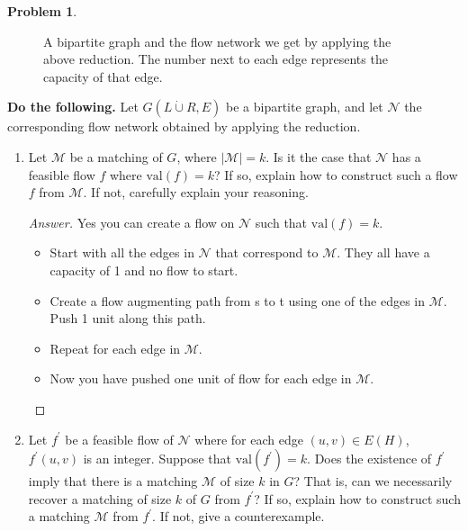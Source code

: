 \documentclass[11pt]{article}
\theoremstyle{definition}
\theoremstyle{definition}
\newtheorem{required}{Problem}
\theoremstyle{definition}
\begin{document}
\begin{required}
\begin{figure}[htbp]
		\caption{A bipartite graph and the flow network we get by applying the above reduction. The number next to each edge represents the capacity of that edge.\label{fig:H}}
	\end{figure}


\noindent \textbf{Do the following.} Let $G(L \dot \cup R, E)$ be a bipartite graph, and let $\mathcal{N}$ the corresponding flow network obtained by applying the reduction.
\begin{enumerate}[label=(\alph*)]
\item Let $\mathcal{M}$ be a matching of $G$, where $|\mathcal{M}| = k$. Is it the case that $\mathcal{N}$ has a feasible flow $f$ where $\text{val}(f) = k$? If so, explain how to construct such a flow $f$ from $\mathcal{M}$. If not, carefully explain your reasoning.

\begin{proof}[Answer]
Yes you can create a flow on $\mathcal{N}$ such that $\text{val}(f) = k$. 
\begin{itemize}
    \item Start with all the edges in $\mathcal{N}$ that correspond to $\mathcal{M}$. They all have a capacity of 1 and no flow to start. 
    \item Create a flow augmenting path from s to t using one of the edges in $\mathcal{M}$. Push 1 unit along this path. 
    \item Repeat for each edge in $\mathcal{M}$. 
    \item Now you have pushed one unit of flow for each edge in $\mathcal{M}$.  
\end{itemize}

\end{proof}




\vskip 50pt
\item Let $f^{\prime}$ be a feasible flow of $\mathcal{N}$ where for each edge $(u, v) \in E(H)$, $f^{\prime}(u, v)$ is an integer. Suppose that $\text{val}(f^{\prime}) = k$. Does the existence of $f^{\prime}$ imply that there is a matching $\mathcal{M}$ of size $k$ in $G$? That is, can we necessarily recover a matching of size $k$ of $G$ from $f^{\prime}$?  If so, explain how to construct such a matching $\mathcal{M}$ from $f^{\prime}$. If not, give a counterexample.


\end{enumerate}
\end{required}
\end{document}
